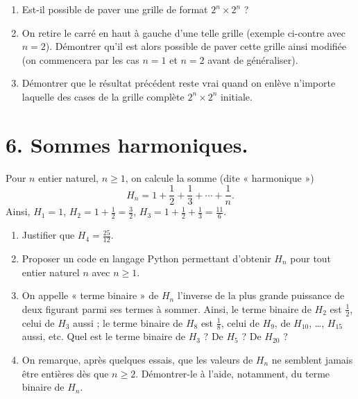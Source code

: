\begin{minipage}{.65\linewidth}
\begin{enumerate}
\item Est-il possible de paver une grille de format \( 2^n \times 2^n \) ?
\item On retire le carré en haut à gauche d'une telle grille (exemple ci-contre avec \( n = 2 \)). Démontrer qu'il est alors possible de paver cette grille ainsi modifiée (on commencera par les cas \( n = 1 \) et \( n = 2 \) avant de généraliser).
\item Démontrer que le résultat précédent reste vrai quand on enlève n'importe laquelle des cases de la grille complète \( 2^n \times 2^n \) initiale.
\end{enumerate}
\end{minipage}
\hfill\begin{minipage}{.35\linewidth}
\begin{center}
\end{center}
\end{minipage}



\section*{6. Sommes harmoniques.}

Pour \( n \) entier naturel, \( n \geqslant 1 \), on calcule la somme (dite « harmonique »)
\[
H_n = 1 + \frac{1}{2} + \frac{1}{3} + \cdots + \frac{1}{n}.
\]
Ainsi, \( H_1 = 1 \), \( H_2 = 1 + \frac{1}{2} = \frac{3}{2} \), \( H_3 = 1 + \frac{1}{2} + \frac{1}{3} = \frac{11}{6} \).

\begin{enumerate}
\item Justifier que \( H_4 = \frac{25}{12} \).
\item Proposer un code en langage Python permettant d'obtenir \( H_n \) pour tout entier naturel \( n \) avec \( n \geqslant 1 \).
\item On appelle « terme binaire » de \( H_n \) l'inverse de la plus grande puissance de deux figurant parmi ses termes à sommer. Ainsi, le terme binaire de \( H_2 \) est \( \frac{1}{2} \), celui de \( H_3 \) aussi ; le terme binaire de \( H_8 \) est \( \frac{1}{8} \), celui de \( H_9 \), de \( H_{10} \), \ldots, \( H_{15} \) aussi, etc. Quel est le terme binaire de \( H_3 \) ? De \( H_5 \) ? De \( H_{20} \) ?
\item On remarque, après quelques essais, que les valeurs de \( H_n \) ne semblent jamais être entières dès que \( n \geqslant 2 \). Démontrer-le à l'aide, notamment, du terme binaire de \( H_n \).
\end{enumerate}
